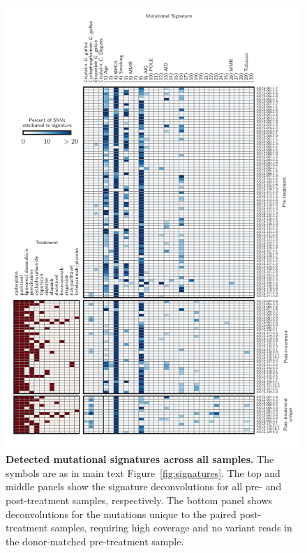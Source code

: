 \begin{figure}
\centering
\includegraphics[scale=1.0]{figures/supplementary_signatures.pdf}
\caption{\textbf{Detected mutational signatures across all samples.} The symbols are as in main text Figure~\ref{fig:signatures}. The top and middle panels show the signature deconvolutions for all pre- and post-treatment samples, respectively. The bottom panel shows deconvolutions for the mutations unique to the paired post-treatment samples, requiring high coverage and no variant reads in the donor-matched pre-treatment sample.}
\label{fig:supp_signatures}
\end{figure}

